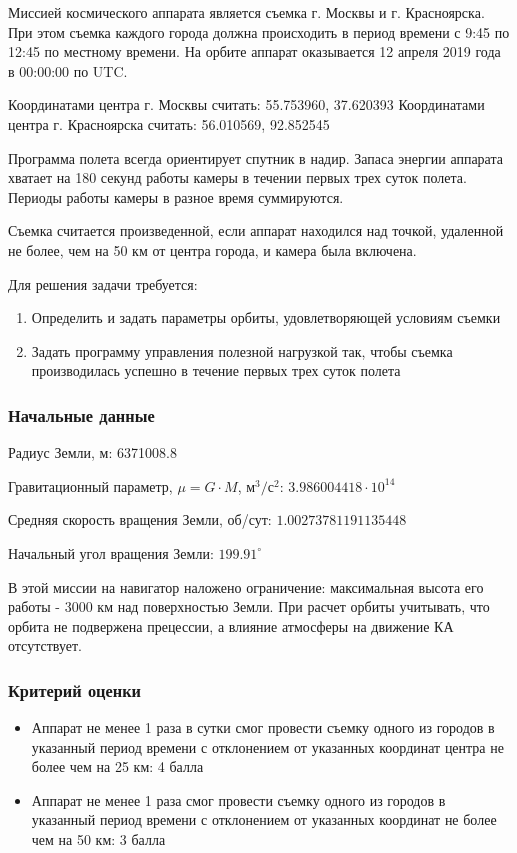 
Миссией космического аппарата является съемка г. Москвы и г. Красноярска. При этом съемка каждого города должна происходить в период времени с 9:45 по 12:45 по местному времени. На орбите аппарат оказывается 12 апреля 2019 года в 00:00:00 по UTC.

Координатами центра г. Москвы считать: 55.753960,  37.620393
Координатами центра г. Красноярска считать: 56.010569, 92.852545

Программа полета всегда ориентирует спутник в надир. Запаса энергии аппарата хватает на 180 секунд работы камеры в течении первых трех суток полета. Периоды работы камеры в разное время суммируются.

Съемка считается произведенной, если аппарат находился над точкой, удаленной не более, чем на 50 км от центра города, и камера была включена.

Для решения задачи требуется:


\begin{enumerate}
    \item Определить и задать параметры орбиты, удовлетворяющей условиям съемки
    \item Задать программу управления полезной нагрузкой так, чтобы съемка производилась успешно в течение первых трех суток полета    
\end{enumerate}

\subsubsection*{Начальные данные}

Радиус Земли, м: 6371008.8

Гравитационный параметр, $\mu = G \cdot M$, м$^3/$с$^2$: $3.986004418 \cdot 10^{14}$

Средняя скорость вращения Земли, об/сут: $1.00273781191135448$

Начальный угол вращения Земли: $199.91^{\circ}$


В этой миссии на навигатор наложено ограничение: максимальная высота его работы - 3000 км над поверхностью Земли. При расчет орбиты учитывать, что орбита не подвержена прецессии, а влияние атмосферы на движение КА отсутствует.

\subsubsection*{Критерий оценки}

\begin{itemize}
    \item Аппарат не менее 1 раза в сутки смог провести съемку одного из городов в указанный период времени с отклонением от указанных координат центра не более чем на 25 км: 4 балла
    \item Аппарат не менее 1 раза смог провести съемку одного из городов в указанный период времени с отклонением от указанных координат не более чем на 50 км: 3 балла
\end{itemize}